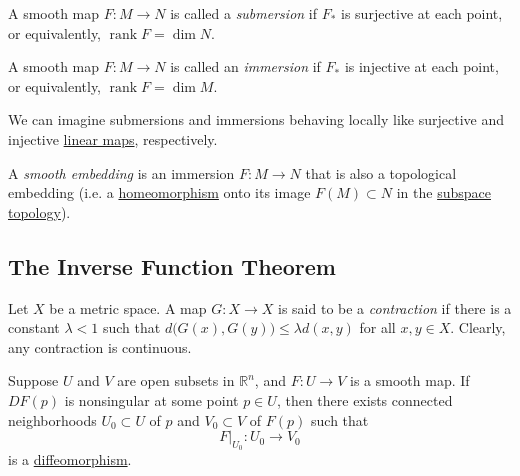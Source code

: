 \documentclass{article}
\DeclareMathOperator{\rank}{rank}
\newcounter{theorem}[section]
\newcounter{definition}[section]
\begin{document}
    \begin{definition}[Submersion]
      \label{def:submersion}
    A smooth map $F: M \to N$ is called a \textit{submersion} if $F_*$ is surjective at each point, or equivalently, $\rank{F} = \dim{N}$. 
    \end{definition}

    \begin{definition}[Immersion]
      \label{def:immersion}
    A smooth map $F: M \to N$ is called an \textit{immersion} if $F_*$ is injective at each point, or equivalently, $\rank{F} = \dim{M}$. 
    \end{definition}

    We can imagine submersions and immersions behaving locally like surjective and injective \hyperref[lin-def:linear_map]{linear maps}, respectively. 

    \begin{definition}
      \label{def:smooth-embedding}
    A \textit{smooth embedding} is an immersion $F: M \to N$ that is also a topological embedding (i.e. a \hyperref[pst-def:homeomorphism]{homeomorphism} onto its image $F(M) \subset N$ in the \hyperref[pst-def:subspace-topology]{subspace topology}). 
    \end{definition}

  \subsection{The Inverse Function Theorem}

    \begin{definition}[Contraction]
      \label{def:contraction}
    Let $X$ be a metric space. A map $G: X \to X$ is said to be a \textit{contraction} if there is a constant $\lambda < 1$ such that $d\big( G(x), G(y) \big) \leq \lambda d(x, y)$ for all $x, y \in X$. Clearly, any contraction is continuous. 
    \end{definition}

    \begin{theorem}
      \label{thm:inverse-function-theorem-on-euclidean-space}
    Suppose $U$ and $V$ are open subsets in $\mathbb{R}^n$, and $F: U \to V$ is a smooth map. If $DF(p)$ is nonsingular at some point $p \in U$, then there exists connected neighborhoods $U_0 \subset U$ of $p$ and $V_0 \subset V$ of $F(p)$ such that 
    \begin{equation}
      F \big|_{U_0} : U_0 \to V_0
    \end{equation}
    is a \hyperref[def:diffeomorphism-2]{diffeomorphism}. 
    \end{theorem}
\end{document}
